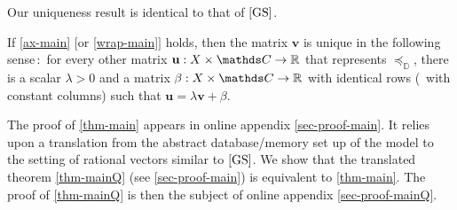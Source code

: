 \documentclass[12pt,a4paper,twoside]{article}
\newcommand{\gsii}{$\textup{[GS]}$}
\newcommand{\preceqb}{\mathbin{\preceq}}
\newcommand{\mbbd}{{\mathds D}}
\newcommand{\mbbc}{{\mathds C}}
\newcommand{\mbbt}{{\mathds {T}}}
\newcommand{\Condtwodiv}{\textup{Conditional-\textit{2}-diversity}}
\begin{document}

Our uniqueness result is identical to that of \gsii.  \setcounter{theorem}{0}
\begin{theorem}%
  If \ref{ax-main} $[$or \ref{wrap-main}$]$ holds, then the matrix
  $ \mathbf{v} $ is unique in the following sense$\,:$ for every other matrix
  $ \mathbf{u} : X \times \mbbc \rightarrow \R $ that represents
  $\preceqb_{\mbbd}$, there is a scalar $ \lambda > 0 $ and a matrix
  $ \beta : X \times \mbbc \rightarrow \R$ with identical rows (\ie\ with
  constant columns) such that $ \mathbf{u} = \lambda \mathbf{v} + \beta$.
  
\end{theorem}



The proof of \cref{thm-main} appears in online appendix \ref{sec-proof-main}. It
relies upon a translation from the abstract database/memory set up of the model
to the setting of rational vectors similar to \gsii. We show that the translated
theorem \cref{thm-mainQ} (see \cref{sec-proof-main}) is equivalent to
\cref{thm-main}. The proof of \cref{thm-mainQ} is then the subject of online
appendix \ref{sec-proof-mainQ}.
\end{document}
